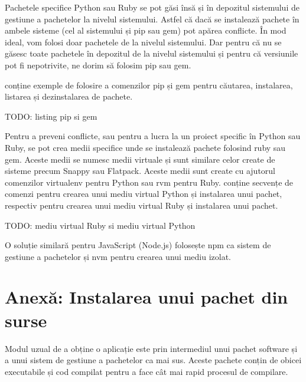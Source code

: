 Pachetele specifice Python sau Ruby se pot găsi însă și în depozitul sistemului de gestiune a pachetelor la nivelul sistemului. Astfel că dacă se instalează pachete în ambele sisteme (cel al sistemului și pip sau gem) pot apărea conflicte. În mod ideal, vom folosi doar pachetele de la nivelul sistemului. Dar pentru că nu se găsesc toate pachetele în depozitul de la nivelul sistemului și pentru că versiunile pot fi nepotrivite, ne dorim să folosim pip sau gem.

 conține exemple de folosire a comenzilor pip și gem pentru căutarea, instalarea, listarea și dezinstalarea de pachete.

\begin{screen}[caption={Gestiunea pachetelor în medii specifice (pip și gem)},label={lst:package:pip-gem}]
TODO: listing pip si gem
\end{screen}

Pentru a preveni conflicte, sau pentru a lucra la un proiect specific în Python sau Ruby, se pot crea medii specifice unde se instalează pachete folosind ruby sau gem. Aceste medii se numesc medii virtuale și sunt similare celor create de sisteme precum Snappy sau Flatpack. Aceste medii sunt create cu ajutorul comenzilor virtualenv pentru Python sau rvm pentru Ruby.  conține secvențe de comenzi pentru crearea unui mediu virtual Python și instalarea unui pachet, respectiv pentru crearea unui mediu virtual Ruby și instalarea unui pachet.

\begin{screen}[caption={Crearea unui mediu virtual (Python și Ruby)},label={lst:package:env-create}]
TODO: mediu virtual Ruby si mediu virtual Python
\end{screen}

O soluție similară pentru JavaScript (Node.js) folosește npm ca sistem de gestiune a pachetelor și nvm pentru crearea unui mediu izolat.

\section{Anexă: Instalarea unui pachet din surse}
\label{sec:package:source}

Modul uzual de a obține o aplicație este prin intermediul unui pachet software și a unui sistem de gestiune a pachetelor ca mai sus. Aceste pachete conțin de obicei executabile și cod compilat pentru a face cât mai rapid procesul de compilare.

